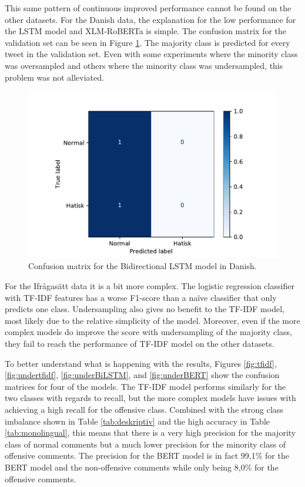 \documentclass[nofilelist]{cslthse-msc}
\begin{document}
This same pattern of continuous improved performance cannot be found on the other datasets. For the Danish data, the explanation for the low performance for the LSTM model and XLM-RoBERTa is simple. The confusion matrix for the validation set can be seen in Figure \ref{fig:danlstm}. The majority class is predicted for every tweet in the validation set. Even with some experiments where the minority class was oversampled and others where the minority class was undersampled, this problem was not alleviated.


\begin{figure}[t]
    \centering
    \includegraphics[width=\textwidth*3/4]{bilstmcharsDanish.pdf}
    \caption{Confusion matrix for the Bidirectional LSTM model in Danish.}
    \label{fig:danlstm}
\end{figure}

For the Ifrågasätt data it is a bit more complex. The logistic regression classifier with TF-IDF features has a worse F1-score than a naïve classifier that only predicts one class. Undersampling also gives no benefit to the TF-IDF model, most likely due to the relative simplicity of the model. Moreover, even if the more complex models do improve the score with undersampling of the majority class, they fail to reach the performance of TF-IDF model on the other datasets. 

To better understand what is happening with the results,  Figures \ref{fig:tfidf},  \ref{fig:undertfidf}, \ref{fig:underBiLSTM}, and \ref{fig:underBERT}  show the confusion matrices for four of the models. The TF-IDF model performs similarly for the two classes with regards to recall, but the more complex models have issues with achieving a high recall for the offensive class. Combined with the strong class imbalance shown in Table \ref{tab:deskriptiv} and the high accuracy in Table \ref{tab:monolingual}, this means that there is a very high precision for the majority class of normal comments but a much lower precision for the minority class of offensive comments. The precision for the BERT model is in fact 99,1\% for the BERT model and the non-offensive comments while only being 8,0\% for the offensive comments.
\end{document}

